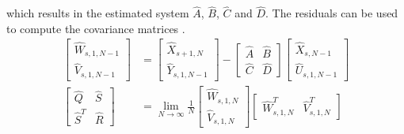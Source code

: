 which results in the estimated system $\hat{A}$, $\hat{B}$, $\hat{C}$ and $\hat{D}$. The residuals can be used to compute the covariance matrices \cite[p.~333]{FilteringIdentification}.
\begin{align*}
    \begin{bmatrix} \hat{W}_{s,1,N-1} \\ \hat{V}_{s,1,N-1} \end{bmatrix} &= \begin{bmatrix} \hat{X}_{s+1,N} \\ \hat{Y}_{s,1,N-1} \end{bmatrix} - \begin{bmatrix} \hat{A} & \hat{B}\\ \hat{C} & \hat{D} \end{bmatrix} \begin{bmatrix} \hat{X}_{s,N-1} \\ \hat{U}_{s,1,N-1} \end{bmatrix} \\
    \begin{bmatrix} \hat{Q} & \hat{S}\\ \hat{S}^T & \hat{R} \end{bmatrix} &= \lim_{N \xrightarrow{}\infty} \frac{1}{N} \begin{bmatrix} \hat{W}_{s,1,N} \\ \hat{V}_{s,1,N} \end{bmatrix} \begin{bmatrix} \hat{W}_{s,1,N}^T & \hat{V}_{s,1,N}^T \end{bmatrix}
\end{align*}


     
